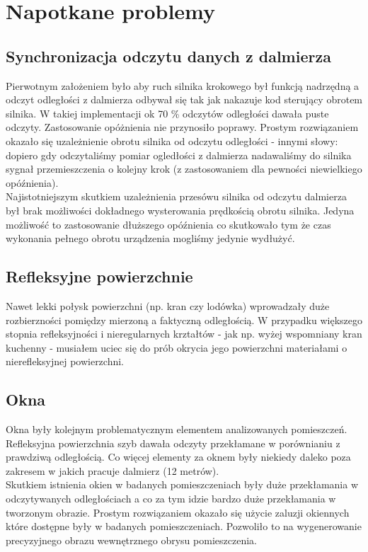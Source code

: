 \section {Napotkane problemy}
\subsection {Synchronizacja odczytu danych z dalmierza}
Pierwotnym założeniem było aby ruch silnika krokowego był funkcją nadrzędną a odczyt odległości z dalmierza odbywał się tak jak nakazuje kod sterujący obrotem silnika. W takiej implementacji ok 70 \% odczytów odległości dawała puste odczyty. Zastosowanie opóżnienia nie przynosiło poprawy. Prostym rozwiązaniem okazało się uzależnienie obrotu silnika od odczytu odległości - innymi słowy: dopiero gdy odczytaliśmy pomiar ogledłości z dalmierza nadawaliśmy do silnika sygnał przemieszczenia o kolejny krok (z zastosowaniem dla pewności niewielkiego opóźnienia).\\

Najistotniejszym skutkiem uzależnienia przesówu silnika od odczytu dalmierza był brak możliwości dokładnego wysterowania prędkością obrotu silnika. Jedyna możliwość to zastosowanie dłuższego opóźnienia co skutkowało tym że czas wykonania pełnego obrotu urządzenia mogliśmy jedynie wydłużyć. 

\subsection {Refleksyjne powierzchnie}
Nawet lekki połysk powierzchni (np. kran czy lodówka) wprowadzały duże rozbierzności pomiędzy mierzoną a faktyczną odległością. W przypadku większego stopnia refleksyjności i nieregularnych krztałtów - jak np. wyżej wspomniany kran kuchenny - musiałem uciec się do prób okrycia jego powierzchni materiałami o nierefleksyjnej powierzchni.

\subsection {Okna}
Okna były kolejnym problematycznym elementem analizowanych pomieszczeń. Refleksyjna powierzchnia szyb dawała odczyty przekłamane w porównianiu z prawdziwą odległością. Co więcej elementy za oknem były niekiedy daleko poza zakresem w jakich pracuje dalmierz (12 metrów).\\

Skutkiem istnienia okien w badanych pomieszczeniach były duże przekłamania w odczytywanych odległościach a co za tym idzie bardzo duże przekłamania w tworzonym obrazie. Prostym rozwiązaniem okazało się użycie zaluzji okiennych które dostępne były w  badanych pomieszczeniach. Pozwoliło to na wygenerowanie precyzyjnego obrazu wewnętrznego obrysu pomieszczenia.

